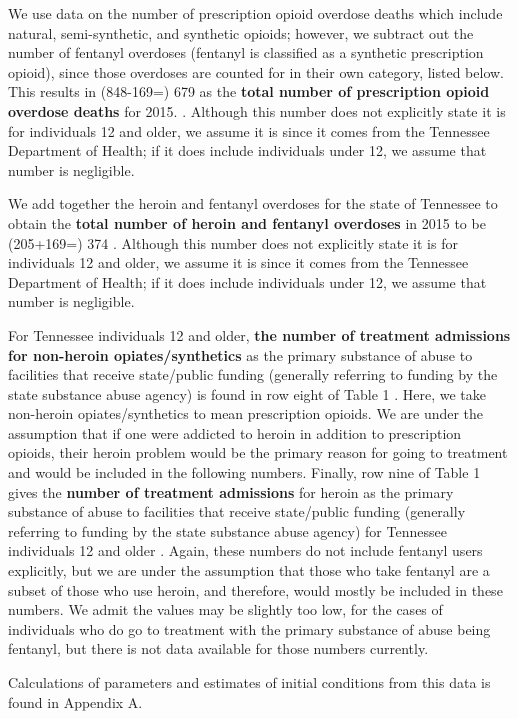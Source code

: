 \documentclass[12pt]{article}
\begin{document}
We use data on the number of prescription opioid overdose deaths which include natural, semi-synthetic, and synthetic opioids; however, we subtract out the number of fentanyl overdoses (fentanyl is classified as a synthetic prescription opioid), since those overdoses are counted for in their own category, listed below. This results in (848-169=) 679 as the \textbf{total number of prescription opioid overdose deaths} for 2015. \cite{PDO}. Although this number does not explicitly state it is for individuals 12 and older, we assume it is since it comes from the Tennessee Department of Health; if it does include individuals under 12, we assume that number is negligible. 

We add together the heroin and fentanyl overdoses for the state of Tennessee to obtain the \textbf{total number of heroin and fentanyl overdoses} in 2015 to be (205+169=) 374 \cite{PDO}. Although this number does not explicitly state it is for individuals 12 and older, we assume it is since it comes from the Tennessee Department of Health; if it does include individuals under 12, we assume that number is negligible. 

For Tennessee individuals 12 and older, \textbf{the number of treatment admissions for non-heroin opiates/synthetics} as the primary substance of abuse to facilities that receive state/public funding (generally referring to funding by the state substance abuse agency) is found in row eight of Table 1 \cite{TEDS2015_SAMSHA_admissions}. Here, we take non-heroin opiates/synthetics to mean prescription opioids. We are under the assumption that if one were addicted to heroin in addition to prescription opioids, their heroin problem would be the primary reason for going to treatment and would be included in the following numbers. Finally, row nine of Table 1 gives the \textbf{number of treatment admissions} for heroin as the primary substance of abuse to facilities that receive state/public funding (generally referring to funding by the state substance abuse agency) for Tennessee individuals 12 and older \cite{TEDS2015_SAMSHA_admissions}. Again, these numbers do not include fentanyl users explicitly, but we are under the assumption that those who take fentanyl are a subset of those who use heroin, and therefore, would mostly be included in these numbers. We admit the values may be slightly too low, for the cases of individuals who do go to treatment with the primary substance of abuse being fentanyl, but there is not data available for those numbers currently. 


Calculations of parameters and estimates of initial conditions from this data is found in Appendix A. \\
\end{document}
